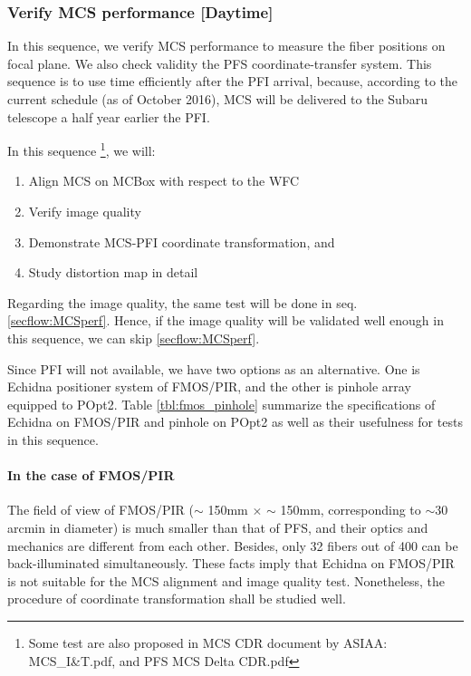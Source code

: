\subsubsection{Verify MCS performance [Daytime]}\label{secflow:prestudy}
In this sequence, we verify MCS performance to measure the fiber positions on focal plane.
We also check validity the PFS coordinate-transfer system.
This sequence is to use time efficiently after the PFI arrival, because, according to the current schedule (as of October 2016), MCS will be delivered to the Subaru telescope a half year earlier the PFI.

In this sequence \footnote{Some test are also proposed in MCS CDR document by ASIAA: MCS\_I\&T.pdf, and PFS MCS Delta CDR.pdf}, we will:
\begin{enumerate}
\item Align MCS on MCBox with respect to the WFC
\item Verify image quality
\item Demonstrate MCS-PFI coordinate transformation, and
\item Study distortion map in detail
\end{enumerate}

Regarding the image quality, the same test will be done in seq. \ref{secflow:MCSperf}.
Hence, if the image quality will be validated well enough in this sequence, we can skip \ref{secflow:MCSperf}.

Since PFI will not available, we have two options as an alternative.
One is Echidna positioner system of FMOS/PIR, and the other is pinhole array equipped to POpt2.
Table \ref{tbl:fmos_pinhole} summarize the specifications of Echidna on FMOS/PIR and pinhole on POpt2 as well as their usefulness for tests in this sequence. 

\paragraph{In the case of FMOS/PIR}
The field of view of FMOS/PIR ($\sim$ 150mm $\times$ $\sim$ 150mm, corresponding to $\sim 30$ arcmin in diameter) is much smaller than that of PFS, and their optics and mechanics are different from each other.
Besides, only 32 fibers out of 400 can be back-illuminated simultaneously.
These facts imply that Echidna on FMOS/PIR is not suitable for the MCS alignment and image quality test.
Nonetheless, the procedure of coordinate transformation shall be studied well.

